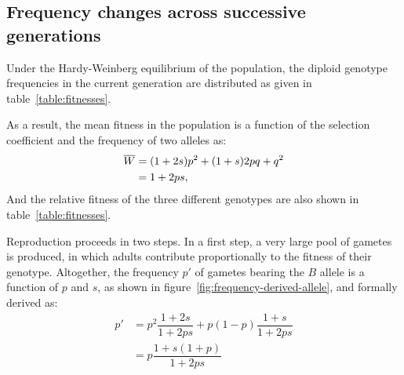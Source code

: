 \subsection{Frequency changes across successive generations}

Under the Hardy-Weinberg equilibrium of the population, the diploid genotype frequencies in the current generation are distributed as given in table~\ref{table:fitnesses}.

As a result, the mean fitness in the population is a function of the selection coefficient and the frequency of two alleles as:
\begin{align}
    \overline{W} &= (1+2s)p^2 + (1+s)2pq + q^2 \\
    &= 1 + 2ps,
\end{align}
And the relative fitness of the three different genotypes are also shown in table~\ref{table:fitnesses}.

\begin{table}[H]
    \centering
    \noindent{}
    \caption[Fitnesses of the different genotypes]{Fitnesses of the different genotypes}\label{table:fitnesses}
\end{table}

Reproduction proceeds in two steps.
In a first step, a very large pool of gametes is produced, in which adults contribute proportionally to the fitness of their genotype.
Altogether, the frequency $p'$ of gametes bearing the $B$ allele is a function of $p$ and $s$, as shown in figure~\ref{fig:frequency-derived-allele}, and formally derived as:
\begin{align}
    p' & = p^2 \dfrac{1+2s}{1+2ps} + p (1-p)\dfrac{1+s}{1+2ps}\\
    & = p\dfrac{1+s(1+p)}{1 + 2ps}
\end{align}

